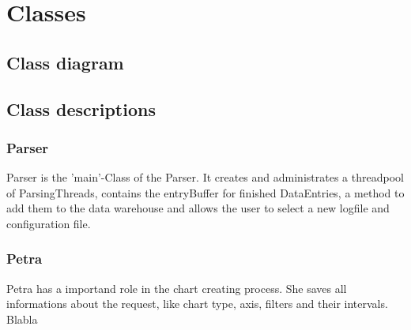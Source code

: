 \section{Classes}

\subsection{Class diagram}

\subsection{Class descriptions}

\subsubsection{Parser}

Parser is the 'main'-Class of the Parser. It creates and administrates a threadpool of ParsingThreads,
contains the entryBuffer for finished DataEntries, a method to add them to the data warehouse
and allows the user to select a new logfile and configuration file.


\subsubsection*{Petra}
Petra has a importand role in the chart creating process. She saves all informations about the request,
like chart type, axis, filters and their intervals. Blabla
